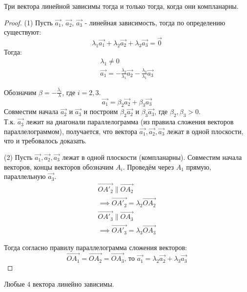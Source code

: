 \begin{theorem}
  Три вектора линейной зависимы тогда и только тогда, когда они компланарны.
\end{theorem}
\begin{proof}
  (1) Пусть $\vec{a_1}$, $\vec{a_2}$, $\vec{a_3}$ - линейная зависимость, тогда по определению существуют:
  \[
  \lambda_1 \vec{a_1} + \lambda_2 \vec{a_2} + \lambda_3 \vec{a_3} = \vec{0}
  \] 
  Тогда:
  \begin{gather*}
    \lambda_1 \neq 0 \\
    \vec{a_1} = -\frac{\lambda_2}{\lambda_1} \vec{a_2} - \frac{\lambda_3}{\lambda_1} \vec{a_3}
  \end{gather*}

  Обозначим $\beta = -\frac{\lambda_i}{\lambda}$, где $i = 2, 3$. \[
    \vec{a_1} = \beta_2 \vec{a_2} + \beta_3 \vec{a_3}
  \]
  Совместим начала $\vec{a_2}$ и $\vec{a_3}$ и построим $\beta_2 \vec{a_2}$ и $\beta_3 \vec{a_3}$, где $\beta_2, \beta_3 > 0$. \\
  Т.к. $\vec{a_3}$ лежит на диагонали параллелограмма (из правила сложения векторов параллелограммом), получается, что вектора $\vec{a_1}, \vec{a_2}, \vec{a_3}$ лежат в одной плоскости, что и требовалось доказать.

  (2) Пусть $\vec{a_1}, \vec{a_2}, \vec{a_3}$ лежат в одной плоскости (компланарны). Совместим начала векторов, концы векторов обозначим $A_i$. Проведём через $A_1$ прямую, параллельную $\vec{a_3}$.
  \begin{gather*}
    \overrightarrow{OA'_2} \parallel \overrightarrow{OA_2} \\
    \implies \overrightarrow{OA'_2} = \lambda_2 \overrightarrow{OA_2} \\
    \overrightarrow{OA'_3} \parallel \overrightarrow{OA_3} \\
    \implies \overrightarrow{OA'_3} = \lambda_3 \overrightarrow{OA_3}
  \end{gather*}

  Тогда согласно правилу параллелограмма сложения векторов: \[
    \overrightarrow{OA_1} = \overrightarrow{OA_2} = \overrightarrow{OA_3} \text{, то } \vec{a_1} = \lambda_2 \vec{a_2} + \lambda_3 \vec{a_3}
  \]
\end{proof}

\begin{theorem}
  Любые 4 вектора линейно зависимы.
\end{theorem}

